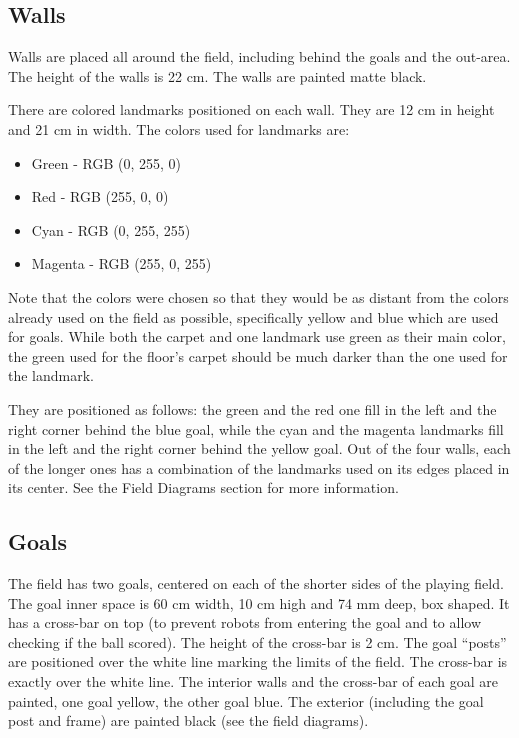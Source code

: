 \documentclass{article}
\begin{document}
\subsection{ Walls \label{ref-031}}

Walls are placed all around the field, including behind the goals and the
out-area. The height of the walls is 22 cm. The walls are painted matte black.

There are colored landmarks positioned on each wall. They are 12 cm in height
and 21 cm in width. The colors used for landmarks are:

\begin{itemize}
\item Green - RGB (0, 255, 0)

\item Red - RGB (255, 0, 0)

\item Cyan - RGB (0, 255, 255)

\item Magenta - RGB (255, 0, 255)

\end{itemize}

Note that the colors were chosen so that they would be as distant from the
colors already used on the field as possible, specifically yellow and blue
which are used for goals. While both the carpet and one landmark use green as
their main color, the green used for the floor's carpet should be much darker
than the one used for the landmark.

They are positioned as follows: the green and the red one fill in the left and
the right corner behind the blue goal, while the cyan and the magenta landmarks
fill in the left and the right corner behind the yellow goal. Out of the four
walls, each of the longer ones has a combination of the landmarks used on its
edges placed in its center. See the Field Diagrams section for more
information.

\subsection{ Goals \label{ref-032}}

The field has two goals, centered on each of the shorter sides of the playing
field. The goal inner space is 60 cm width, 10 cm high and 74 mm deep, box
shaped. It has a cross-bar on top (to prevent robots from entering the goal and
to allow checking if the ball scored). The height of the cross-bar is 2 cm. The
goal ``posts'' are positioned over the white line marking the limits of the
field. The cross-bar is exactly over the white line. The interior walls and the
cross-bar of each goal are painted, one goal yellow, the other goal blue. The
exterior (including the goal post and frame) are painted black (see the field
diagrams).
\end{document}
